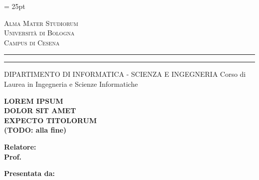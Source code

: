 \oddsidemargin = 25pt

\begin{titlepage}
    \begin{center}
    {
        {\Large{\textsc{Alma Mater Studiorum}}} \\
        {\Large{\textsc{Università di Bologna}}} \\
        {\textsc{Campus di Cesena}}
        \vspace{-1mm}
    }
    \end{center}
    \begin{center}
    {
        \rule[0.1cm]{\textwidth}{0.1mm}
        \rule[0.5cm]{\textwidth}{0.6mm}
        DIPARTIMENTO DI INFORMATICA - SCIENZA E INGEGNERIA
        Corso di Laurea in Ingegneria e Scienze Informatiche
    }
    \end{center}

    \vspace{2.25cm} %

    \begin{center}
        {\LARGE{\textbf{LOREM IPSUM}}} \\
        \vspace{0.4cm}
        {\LARGE{\textbf{DOLOR SIT AMET}}} \\
        \vspace{0.4cm}
        {\LARGE{\textbf{EXPECTO TITOLORUM}}} \\
        \vspace{0.4cm}
        {\LARGE{\textbf{(TODO: alla fine)}}}
    \end{center}

    \vspace{2.25cm} %
    \par
    \noindent
    \begin{minipage}[t]{0.47\textwidth}
        {\large{\textbf{Relatore:}}} \\
        {\large{\textbf{Prof. \xsupervisor}}}
    \end{minipage}
    \hfill
    \begin{minipage}[t]{0.47\textwidth}\raggedleft
        {\large{\textbf{Presentata da:} \\
        {\large{\textbf{\xstudent}}}}}
    \end{minipage}


\end{titlepage}
